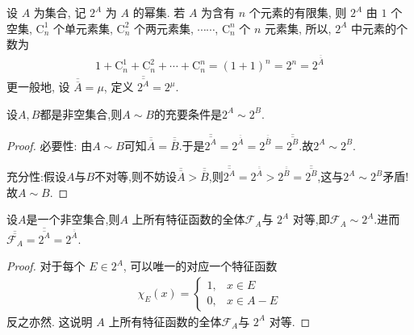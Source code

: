 \documentclass[../../main.tex]{subfiles}%
\begin{document}
\begin{definition}
设 $A$ 为集合, 记 $2^A$ 为 $A$ 的幂集. 若 $A$ 为含有 $n$ 个元素的有限集, 则 $2^A$ 由 $1$ 个空集, $\mathrm{C}_{n}^1$ 个单元素集, $\mathrm{C}_{n}^2$ 个两元素集, $\cdots\cdots$, $\mathrm{C}_{n}^n$ 个 $n$ 元素集, 所以, $2^A$ 中元素的个数为
\begin{align*}
1 + \mathrm{C}_{n}^1 + \mathrm{C}_{n}^2 + \cdots + \mathrm{C}_{n}^n = (1 + 1)^n = 2^n = 2^{\overline{\overline{A}}}
\end{align*}
更一般地, 设 $\overline{\overline{A}} = \mu$, 定义 $\overline{\overline{2^A}} = 2^{\mu}$.
\end{definition}

\begin{proposition}\label{proposition:两集合对等的充要条件是幂集也对等}
设$A,B$都是非空集合,则$A\sim B$的充要条件是$2^A\sim 2^B$.
\end{proposition}
\begin{proof}

{\heiti 必要性:}
由$A\sim B$可知$\overline{\overline{A}}=\overline{\overline{B}}$.于是$\overline{\overline{2^A}}=2^{\overline{\overline{A}}}=2^{\overline{\overline{B}}}=\overline{\overline{2^B}}.$故$2^A\sim 2^B$.

{\heiti 充分性:}假设$A$与$B$不对等,则不妨设$\overline{\overline{A}}>\overline{\overline{B}}$,则$\overline{\overline{2^A}}=2^{\overline{\overline{A}}}>2^{\overline{\overline{B}}}=\overline{\overline{2^B}}$,这与$2^A\sim 2^B$矛盾!故$A\sim B$.

\end{proof}

\begin{lemma}\label{lemma:2^A与A上所有特征函数全体对等}
设$A$是一个非空集合,则$A$ 上所有特征函数的全体$\mathcal{F}_{A}$与 $2^A$ 对等,即$\mathcal{F}_{A}\sim 2^A$.进而$\overline{\overline{\mathcal{F}_{A}}}=\overline{\overline{2^A}}=2^{\overline{\overline{A}}}.$
\end{lemma}
\begin{proof}

对于每个 $E \in 2^A$, 可以唯一的对应一个特征函数
\begin{align*}
\chi_E(x) = 
\begin{cases}
1, & x \in E\\
0, & x \in A - E
\end{cases}
\end{align*}
反之亦然. 这说明 $A$ 上所有特征函数的全体$\mathcal{F}_{A}$与 $2^A$ 对等. 

\end{proof}
\end{document}
